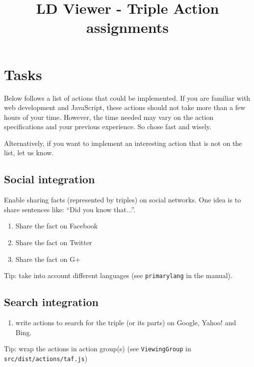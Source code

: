 \documentclass{article}
\begin{document}
\title{LD Viewer - Triple Action assignments}
\date{}
\maketitle



\section{Tasks}
Below follows a list of actions that could be implemented.
If you are familiar with web development and JavaScript, these actions should not take more than a few hours of your time.
However, the time needed may vary on the action specifications and your previous experience. So chose fast and wisely.

Alternatively, if you want to implement an interesting action that is not on the list, let us know.
\subsection{Social integration}
Enable sharing facts (represented by triples) on social networks.
One idea is to share sentences like: ``Did you know that...''.
\begin{enumerate}
\item Share the fact on Facebook
\item Share the fact on Twitter
\item Share the fact on G+
\end{enumerate}
Tip: take into account different languages (see \texttt{primarylang} in the manual).

\subsection{Search integration}
\begin{enumerate}
\item write actions to search for the triple (or its parts) on Google, Yahoo! and Bing.
\end{enumerate}
Tip: wrap the actions in action group(s) (see \texttt{ViewingGroup} in \texttt{src/dist/actions/taf.js})
\end{document}

